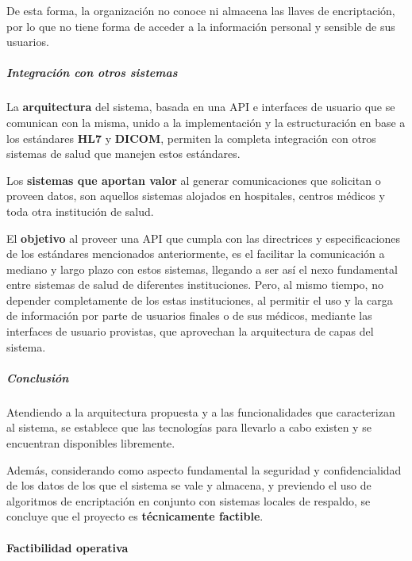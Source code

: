     De esta forma, la organización no conoce ni almacena las llaves de encriptación, por lo que no tiene forma de acceder a la información personal y sensible de sus usuarios.
    



\subparagraph{Integración con otros sistemas}
    
    La \textbf{arquitectura} del sistema, basada en una API e interfaces de usuario que se comunican con la misma, unido a la implementación y la estructuración en base a los estándares \textbf{HL7} y \textbf{DICOM}, permiten la completa integración con otros sistemas de salud que manejen estos estándares.
    
    Los \textbf{sistemas que aportan valor} al generar comunicaciones que solicitan o proveen datos, son aquellos sistemas alojados en hospitales, centros médicos y toda otra institución de salud.
    
    El \textbf{objetivo} al proveer una API que cumpla con las directrices y especificaciones de los estándares mencionados anteriormente, es el facilitar la comunicación a mediano y largo plazo con estos sistemas, llegando a ser así el nexo fundamental entre sistemas de salud de diferentes instituciones.
    Pero, al mismo tiempo, no depender completamente de los estas instituciones, al permitir el uso y la carga de información por parte de usuarios finales o de sus médicos, mediante las interfaces de usuario provistas, que aprovechan la arquitectura de capas del sistema.
    
    


\subparagraph{Conclusión}

Atendiendo a la arquitectura propuesta y a las funcionalidades que caracterizan al sistema, se establece que las tecnologías para llevarlo a cabo existen y se encuentran disponibles libremente.

Además, considerando como aspecto fundamental la seguridad y confidencialidad de los datos de los que el sistema se vale y almacena, y previendo el uso de algoritmos de encriptación en conjunto con sistemas locales de respaldo, se concluye que el proyecto es \textbf{técnicamente factible}.


\paragraph{Factibilidad operativa}

